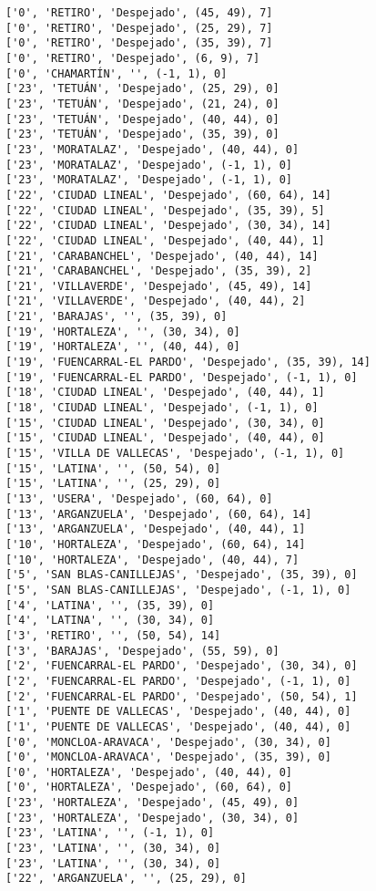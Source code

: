 \documentclass[11pt]{article}
\begin{document}
\begin{Verbatim}[commandchars=\\\{\}]
['0', 'RETIRO', 'Despejado', (45, 49), 7]
['0', 'RETIRO', 'Despejado', (25, 29), 7]
['0', 'RETIRO', 'Despejado', (35, 39), 7]
['0', 'RETIRO', 'Despejado', (6, 9), 7]
['0', 'CHAMARTÍN', '', (-1, 1), 0]
['23', 'TETUÁN', 'Despejado', (25, 29), 0]
['23', 'TETUÁN', 'Despejado', (21, 24), 0]
['23', 'TETUÁN', 'Despejado', (40, 44), 0]
['23', 'TETUÁN', 'Despejado', (35, 39), 0]
['23', 'MORATALAZ', 'Despejado', (40, 44), 0]
['23', 'MORATALAZ', 'Despejado', (-1, 1), 0]
['23', 'MORATALAZ', 'Despejado', (-1, 1), 0]
['22', 'CIUDAD LINEAL', 'Despejado', (60, 64), 14]
['22', 'CIUDAD LINEAL', 'Despejado', (35, 39), 5]
['22', 'CIUDAD LINEAL', 'Despejado', (30, 34), 14]
['22', 'CIUDAD LINEAL', 'Despejado', (40, 44), 1]
['21', 'CARABANCHEL', 'Despejado', (40, 44), 14]
['21', 'CARABANCHEL', 'Despejado', (35, 39), 2]
['21', 'VILLAVERDE', 'Despejado', (45, 49), 14]
['21', 'VILLAVERDE', 'Despejado', (40, 44), 2]
['21', 'BARAJAS', '', (35, 39), 0]
['19', 'HORTALEZA', '', (30, 34), 0]
['19', 'HORTALEZA', '', (40, 44), 0]
['19', 'FUENCARRAL-EL PARDO', 'Despejado', (35, 39), 14]
['19', 'FUENCARRAL-EL PARDO', 'Despejado', (-1, 1), 0]
['18', 'CIUDAD LINEAL', 'Despejado', (40, 44), 1]
['18', 'CIUDAD LINEAL', 'Despejado', (-1, 1), 0]
['15', 'CIUDAD LINEAL', 'Despejado', (30, 34), 0]
['15', 'CIUDAD LINEAL', 'Despejado', (40, 44), 0]
['15', 'VILLA DE VALLECAS', 'Despejado', (-1, 1), 0]
['15', 'LATINA', '', (50, 54), 0]
['15', 'LATINA', '', (25, 29), 0]
['13', 'USERA', 'Despejado', (60, 64), 0]
['13', 'ARGANZUELA', 'Despejado', (60, 64), 14]
['13', 'ARGANZUELA', 'Despejado', (40, 44), 1]
['10', 'HORTALEZA', 'Despejado', (60, 64), 14]
['10', 'HORTALEZA', 'Despejado', (40, 44), 7]
['5', 'SAN BLAS-CANILLEJAS', 'Despejado', (35, 39), 0]
['5', 'SAN BLAS-CANILLEJAS', 'Despejado', (-1, 1), 0]
['4', 'LATINA', '', (35, 39), 0]
['4', 'LATINA', '', (30, 34), 0]
['3', 'RETIRO', '', (50, 54), 14]
['3', 'BARAJAS', 'Despejado', (55, 59), 0]
['2', 'FUENCARRAL-EL PARDO', 'Despejado', (30, 34), 0]
['2', 'FUENCARRAL-EL PARDO', 'Despejado', (-1, 1), 0]
['2', 'FUENCARRAL-EL PARDO', 'Despejado', (50, 54), 1]
['1', 'PUENTE DE VALLECAS', 'Despejado', (40, 44), 0]
['1', 'PUENTE DE VALLECAS', 'Despejado', (40, 44), 0]
['0', 'MONCLOA-ARAVACA', 'Despejado', (30, 34), 0]
['0', 'MONCLOA-ARAVACA', 'Despejado', (35, 39), 0]
['0', 'HORTALEZA', 'Despejado', (40, 44), 0]
['0', 'HORTALEZA', 'Despejado', (60, 64), 0]
['23', 'HORTALEZA', 'Despejado', (45, 49), 0]
['23', 'HORTALEZA', 'Despejado', (30, 34), 0]
['23', 'LATINA', '', (-1, 1), 0]
['23', 'LATINA', '', (30, 34), 0]
['23', 'LATINA', '', (30, 34), 0]
['22', 'ARGANZUELA', '', (25, 29), 0]

\end{Verbatim}
\end{document}
